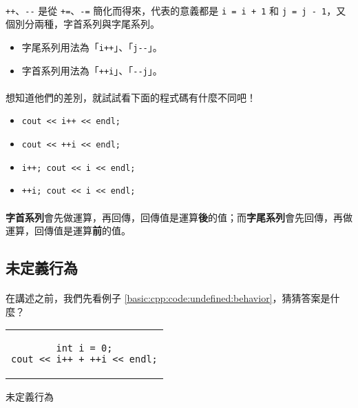 \documentclass[12pt,a4paper,oneside]{report}
\begin{document}
\begin{CJK}{UTF8}{bkai}
\paragraph{}\lstinline!++!、\lstinline!--! 是從 \lstinline!+=!、\lstinline!-=! 簡化而得來，代表的意義都是 \lstinline!i = i + 1! 和 \lstinline!j = j - 1!，又個別分兩種，字首系列與字尾系列。

\begin{itemize}
\item 字尾系列用法為「\lstinline!i++!」、「\lstinline!j--!」。
\item 字首系列用法為「\lstinline!++i!」、「\lstinline!--j!」。
\end{itemize}

\paragraph{}想知道他們的差別，就試試看下面的程式碼有什麼不同吧！
\begin{itemize}
\item \lstinline!cout << i++ << endl;!
\item \lstinline!cout << ++i << endl;!
\item \lstinline!i++; cout << i << endl;!
\item \lstinline!++i; cout << i << endl;!
\end{itemize}

\paragraph{}\textbf{字首系列}會先做運算，再回傳，回傳值是運算\textbf{後}的值；而\textbf{字尾系列}會先回傳，再做運算，回傳值是運算\textbf{前}的值。

\subsection{未定義行為}

\paragraph{}在講述之前，我們先看例子 \ref{basic:cpp:code:undefined:behavior}，猜猜答案是什麼？

\begin{code}[h!]
\centering
\begin{tabular}{c}
\begin{lstlisting}
int i = 0;
cout << i++ + ++i << endl;
\end{lstlisting}
\end{tabular}
\caption{未定義行為}
\label{basic:cpp:code:undefined:behavior}
\end{code}
  

\end{CJK}
\end{document}
